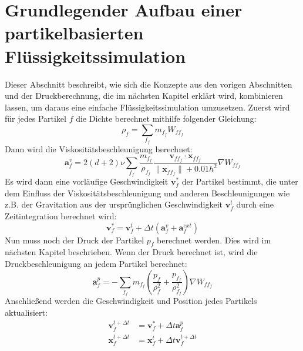 \documentclass[11pt,
a4paper,
parskip=half, %
BCOR=10mm, %
english,
ngerman]{scrreprt}
\begin{document}
\section{Grundlegender Aufbau einer partikelbasierten Flüssigkeitssimulation}
Dieser Abschnitt beschreibt, wie sich die Konzepte aus den vorigen Abschnitten und der Druckberechnung, die im nächsten Kapitel erklärt wird, kombinieren lassen,
um daraus eine einfache Flüssigkeitssimulation umzusetzen.
Zuerst wird für jedes Partikel $f$ die Dichte berechnet mithilfe folgender Gleichung:
\begin{equation}
    \rho_f = \sum_{f_f} m_{f_f} W_{ff_f}
\end{equation}
Dann wird die Viskositätsbeschleunigung berechnet:
\begin{equation}
    \textbf{a}_f^v = 2(d + 2) \nu \sum_{f_f} \frac{m_{f_f}}{\rho_{f_f}} \frac{\textbf{v}_{ff_f} \cdot \textbf{x}_{ff_f}}{\|\textbf{x}_{ff_f}\| + 
    0.01h^2} \nabla W_{ff_f}
\end{equation}
Es wird dann eine vorläufige Geschwindigkeit $\textbf{v}_f^*$ der Partikel bestimmt,
die unter dem Einfluss der Viskositätsbeschleunigung und anderen Beschleunigungen wie z.B. der Gravitation
aus der ursprünglichen Geschwindigkeit $\textbf{v}_f^t$ durch eine Zeitintegration berechnet wird:
\begin{equation}
    \textbf{v}_f^* = \textbf{v}_f^t + \Delta t \left(\textbf{a}_f^v + \textbf{a}_f^{ext}\right)
\end{equation}
Nun muss noch der Druck der Partikel $p_f$ berechnet werden. Dies wird im nächsten Kapitel beschrieben.
Wenn der Druck berechnet ist, wird die Druckbeschleunigung an jedem Partikel berechnet:
\begin{equation}
    \textbf{a}_f^p = -\sum_{f_f} m_{f_f} \left( \frac{p_f}{\rho_f^2} + \frac{p_{f_f}}{\rho_{f_f}^2} \right) \nabla W_{ff_f}
\end{equation}
Anschließend werden die Geschwindigkeit und Position jedes Partikels aktualisiert:
\begin{align}
    \textbf{v}_f^{t + \Delta t} &= \textbf{v}_f^* + \Delta t \textbf{a}_f^p\\
    \textbf{x}_f^{t + \Delta t} &= \textbf{x}_f^t + \Delta t \textbf{v}_f^{t + \Delta t}
\end{align}

\end{document}
